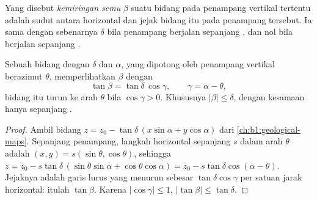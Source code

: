 \begin{definition}\label{def:b1:cross-sections:apparent-dip}
Yang disebut \emph{kemiringan semu} $\beta$ suatu bidang pada penampang vertikal tertentu adalah sudut antara horizontal dan jejak bidang itu pada penampang tersebut. Ia sama dengan  sebenarnya $\delta$ bila penampang berjalan sepanjang , dan nol bila berjalan sepanjang .
\end{definition}

\begin{theorem}\label{thm:b1:cross-sections:apparent-dip}
Sebuah bidang dengan  $\delta$ dan  $\alpha$, yang dipotong oleh penampang vertikal berazimut $\theta$, memperlihatkan  $\beta$ dengan
\[
  \tan\beta = \tan\delta\,\cos\gamma, \qquad \gamma = \alpha - \theta ,
\]
bidang itu turun ke arah $\theta$ bila $\cos\gamma > 0$. Khususnya $|\beta| \le \delta$, dengan kesamaan hanya sepanjang .
\end{theorem}

\begin{proof}
Ambil bidang $z = z_0 - \tan\delta\,(x\sin\alpha + y\cos\alpha)$ dari \cref{ch:b1:geological-maps}. Sepanjang penampang, langkah horizontal sepanjang $s$ dalam arah $\theta$ adalah $(x, y) = s(\sin\theta, \cos\theta)$, sehingga $z = z_0 - s\tan\delta\,(\sin\theta\sin\alpha + \cos\theta\cos\alpha) =
z_0 - s\tan\delta\cos(\alpha - \theta)$. Jejaknya adalah garis lurus yang menurun sebesar $\tan\delta\cos\gamma$ per satuan jarak horizontal: itulah $\tan\beta$. Karena $|\cos\gamma| \le 1$, $|\tan\beta| \le \tan\delta$.
\end{proof}

